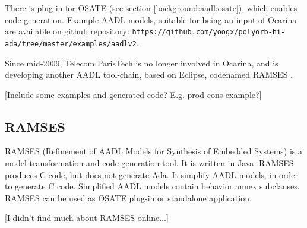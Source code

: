 There is plug-in for OSATE (see section \ref{background:aadl:osate}), which enables code generation. Example AADL models, suitable for being an input of Ocarina are available on github repository: \lstinline{https://github.com/yoogx/polyorb-hi-ada/tree/master/examples/aadlv2}.

Since mid-2009, Telecom ParisTech is no longer involved in Ocarina, and is developing another AADL tool-chain, based on Eclipse, codenamed RAMSES \cite{Ocarina:About:Online}.

[Include some examples and generated code? E.g. prod-cons example?]

\subsection{RAMSES}
\label{background:codegen:ramses}

RAMSES (Refinement of AADL Models for Synthesis of Embedded Systems) is a model transformation and code generation tool. It is written in Java. RAMSES produces C code, but does not generate Ada. It simplify AADL models, in order to generate C code. Simplified AADL models contain behavior annex subclauses. RAMSES can be used as OSATE plug-in or standalone application.

[I didn't find much about RAMSES online...]

